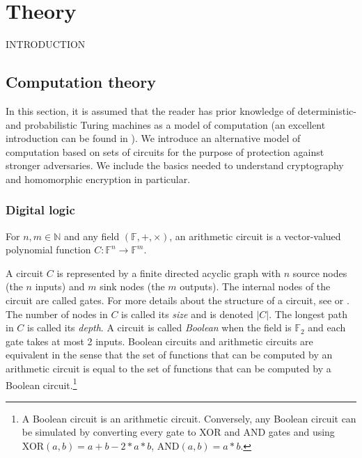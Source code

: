 \chapter{Theory}

INTRODUCTION


\section{Computation theory}
 In this section, it is assumed that the reader has prior knowledge of deterministic- and probabilistic Turing machines as a model of computation (an excellent introduction can be found in \cite{Gol01}). We introduce an alternative model of computation based on sets of circuits for the purpose of protection against stronger adversaries. We include the basics needed to understand cryptography and homomorphic encryption in particular. 

 \subsection*{Digital logic}

\begin{definition}[Circuit]
For $n, m \in \mathbb{N}$ and any field $(\mathbb{F},+,\times)$, an arithmetic circuit is a vector-valued polynomial function $C \colon \mathbb{F}^{n} \to \mathbb{F}^m$. 
\end{definition}

A circuit $C$ is represented by a finite directed acyclic graph with $n$ source nodes (the $n$ inputs) and $m$ sink nodes (the $m$ outputs). The internal nodes of the circuit are called gates. For more details about the structure of a circuit, see \cite{goldreich_2008} or \cite{MF21}. The number of nodes in $C$ is called its \textit{size} and is denoted $|C|$. The longest path in $C$ is called its \textit{depth}.
A circuit is called \textit{Boolean} when the field is $\mathbb{F}_2$ and each gate takes at most 2 inputs. Boolean circuits and arithmetic circuits are equivalent in the sense that the set of functions that can be computed by an arithmetic circuit is equal to the set of functions that can be computed by a Boolean circuit.\footnote{A Boolean circuit is an arithmetic circuit. Conversely, any Boolean circuit can be simulated by converting every gate to XOR and AND gates and using XOR$(a,b) = a+b-2*a*b$, AND$(a,b) = a*b$.} 

